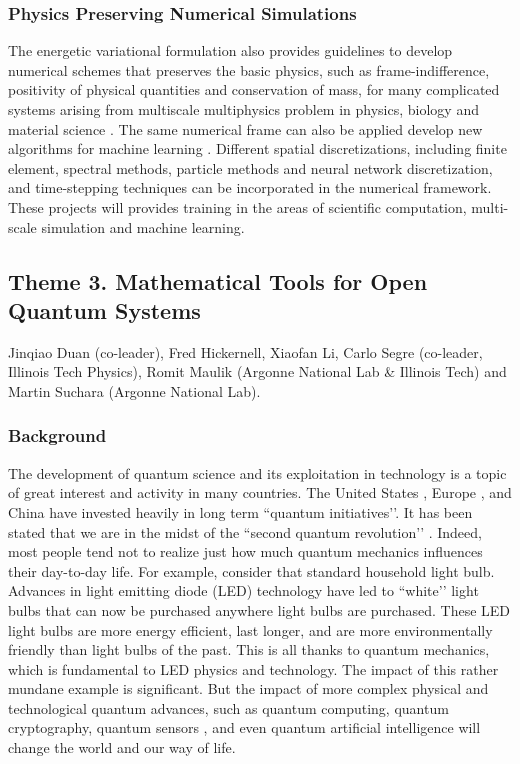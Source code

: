 \documentclass[11pt]{NSFamsart}
\begin{document}
\subsubsection*{Physics Preserving Numerical Simulations}
The energetic variational formulation also provides guidelines to develop numerical schemes that preserves the basic physics, such as frame-indifference, positivity of physical quantities  and conservation of mass, for many complicated systems arising from multiscale multiphysics problem in physics, biology and material science \cite{liu2020variational, liu2020lagrangian, liu2020structure}. The same numerical frame can also be applied develop new algorithms for machine learning \cite{wang2020particle}. Different spatial discretizations, including finite element, spectral methods, particle methods and neural network discretization, and time-stepping techniques can be incorporated in the numerical framework. These projects will provides training in the areas of scientific computation, multi-scale simulation and machine learning.



\subsection*{Theme 3. Mathematical Tools for Open Quantum Systems}
Jinqiao Duan (co-leader), Fred Hickernell, Xiaofan Li,  Carlo Segre (co-leader, Illinois Tech Physics), Romit Maulik (Argonne National Lab \& Illinois Tech) and Martin Suchara (Argonne National Lab).

\subsubsection*{Background} The development of quantum science and its exploitation in technology is a topic of great interest and activity in many countries. The United States \cite{raymer2019us}, Europe \cite{riedel2019europe}, and China \cite{kania2018quantum} have invested heavily in long term ``quantum initiatives’’.  It has been stated that we are in the midst of the ``second quantum revolution’’ \cite{kania2018quantum}. Indeed,  most people tend not to realize just how much quantum mechanics influences their day-to-day life. For example, consider that standard household light bulb. Advances in light emitting diode (LED) technology have led to ``white’’ light bulbs that can now be purchased anywhere light bulbs are purchased. These LED light bulbs are more energy efficient, last longer, and are more environmentally friendly than light bulbs of the past. This is all thanks to quantum mechanics, which is fundamental to LED physics and technology. The impact of this rather mundane example is significant. But the impact of more complex physical and technological quantum advances, such as quantum computing, quantum cryptography, quantum sensors \cite{ng2020guest}, and even quantum artificial intelligence \cite{taylor2020quantum} will change the world and our way of life.
\end{document}
